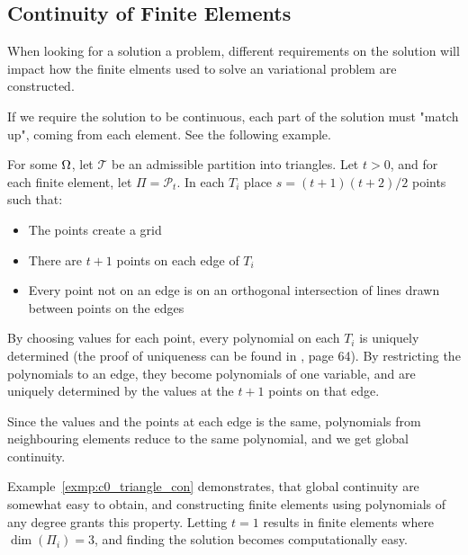 \subsection{Continuity of Finite Elements}
When looking for a solution a problem, 
 different requirements on the solution 
will impact how the finite elments used to solve an 
variational problem are constructed.

If we require the solution to be continuous, each part of the 
solution must "match up", coming from each element. 
See the following example.

\begin{exmp}{\quad\label{exmp:c0_triangle_con}}
For some $\Omega$, let $\mathcal{T}$ be an admissible partition into 
triangles. 
Let $t >0$, and for each finite element, let $\Pi = \mathcal{P}_t$.
In each $T_i$ place
$s = (t+1)(t+2)/2$ points such that:
\begin{itemize}
    \item The points create a grid
    \item There are $t+1$ points on each edge of $T_i$
    \item Every point not on an edge is on an orthogonal intersection of lines drawn between points on the edges 
\end{itemize} %
By choosing values for each point, every polynomial on each $T_i$ 
is uniquely determined (the proof of uniqueness can be found in 
\cite{Braess}, page 64).
By restricting the polynomials to an edge, they become polynomials of 
one variable, and are uniquely determined by the values at the $t+1$ points 
on that edge.

Since the values and the points at each edge is the same, polynomials from 
neighbouring elements reduce to the same polynomial, and we get global 
continuity.
\end{exmp}
Example~\ref{exmp:c0_triangle_con} demonstrates, that global continuity are 
somewhat easy to obtain, and constructing finite elements using polynomials 
of any degree grants this property. Letting $t=1$ results in finite elements 
where $\dim(\Pi_i)=3$, and finding the solution becomes computationally 
easy.



